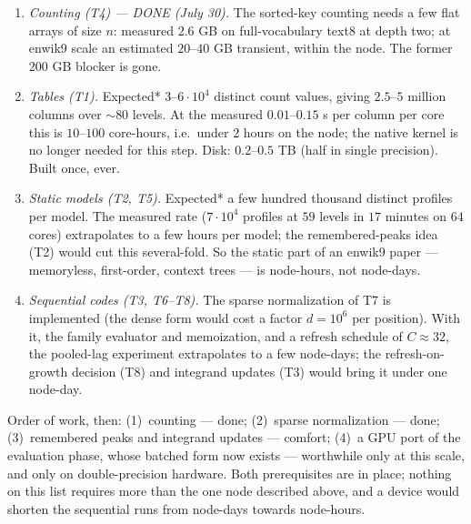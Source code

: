 \documentclass[11pt]{article}
\begin{document}
\begin{enumerate}
\item \emph{Counting (T4) --- DONE (July 30).}  The sorted-key
counting needs a few flat arrays of size $n$: measured $2.6$ GB on
full-vocabulary text8 at depth two; at enwik9 scale an estimated
$20$--$40$ GB transient, within the node.  The former $200$ GB
blocker is gone.

\item \emph{Tables (T1).}  Expected* $3$--$6\cdot 10^4$ distinct
count values, giving $2.5$--$5$ million columns over $\sim 80$
levels.  At the measured $0.01$--$0.15$ s per column per core this is
$10$--$100$ core-hours, i.e.\ under $2$ hours on the node; the
native kernel is no longer needed for this step.  Disk:
$0.2$--$0.5$ TB (half in single precision).  Built once, ever.

\item \emph{Static models (T2, T5).}  Expected* a few hundred
thousand distinct profiles per model.  The measured rate
($7\cdot 10^4$ profiles at $59$ levels in $17$ minutes on $64$
cores) extrapolates to a few hours per model; the remembered-peaks
idea (T2) would cut this several-fold.  So the static part of an
enwik9 paper --- memoryless, first-order, context trees --- is
node-hours, not node-days.

\item \emph{Sequential codes (T3, T6--T8).}  The sparse
normalization of T7 is implemented (the dense form would cost a
factor $d = 10^6$ per position).  With it, the family evaluator and
memoization, and a refresh schedule of $C \approx 32$, the
pooled-lag experiment extrapolates to a few node-days; the
refresh-on-growth decision (T8) and integrand updates (T3) would
bring it under one node-day.
\end{enumerate}

Order of work, then: (1)~counting --- done; (2)~sparse
normalization --- done; (3)~remembered peaks and integrand updates
--- comfort; (4)~a GPU port of the evaluation phase, whose batched
form now exists --- worthwhile only at this scale, and only on
double-precision hardware.  Both prerequisites are in place; nothing
on this list requires more than the one node described above, and a
device would shorten the sequential runs from node-days towards
node-hours.
\end{document}
